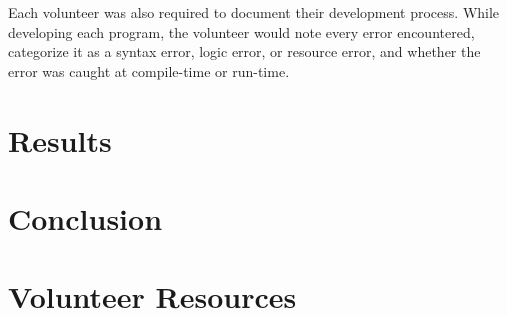 \documentclass[draftcopy,nolof,nolot]{srpaper}
\begin{document}
Each volunteer was also required to document their development process. While
developing each program, the volunteer would note every error encountered,
categorize it as a syntax error, logic error, or resource error, and whether
the error was caught at compile-time or run-time.

\chapter{Results}

\chapter{Conclusion}

\nocite{*}


\appendix
\chapter{Volunteer Resources}\label{app:resources}



\end{document}
